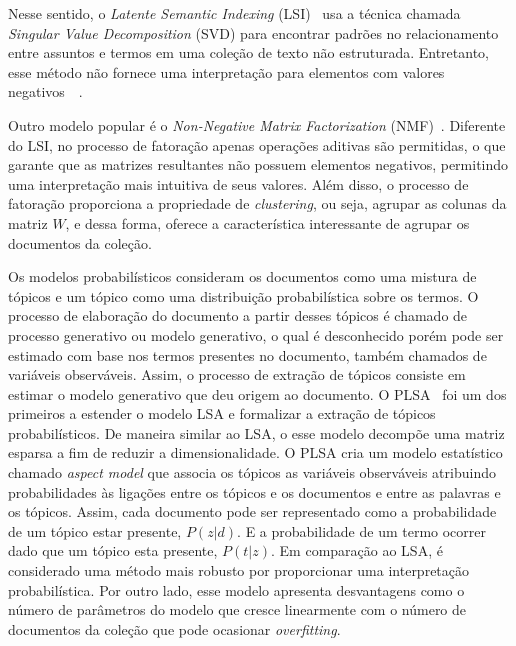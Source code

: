 Nesse sentido, o \textit{Latente Semantic Indexing} (LSI)~\cite{Deerwester1990} usa a técnica chamada \textit{Singular Value Decomposition} (SVD) para encontrar padrões no relacionamento entre assuntos e termos em uma coleção de texto não estruturada. Entretanto, esse método não fornece uma interpretação para elementos com valores negativos~\cite{Deerwester1990}~\cite{Cheng2013}. %

Outro modelo popular é o \textit{Non-Negative Matrix Factorization} (NMF)~\cite{Lee1999}.  Diferente do LSI, no processo de fatoração apenas operações aditivas são permitidas, o que garante que as matrizes resultantes não possuem elementos negativos, permitindo uma interpretação mais intuitiva de seus valores. Além disso, o processo de fatoração proporciona a propriedade de \textit{clustering}, ou seja, agrupar as colunas da matriz $W$, e dessa forma, oferece a característica interessante de agrupar os documentos da coleção.  %



Os modelos probabilísticos consideram os documentos como uma mistura de tópicos e um tópico como uma distribuição probabilística sobre os termos. O processo de elaboração do documento a partir desses tópicos é chamado de processo generativo ou modelo generativo, o qual é desconhecido porém pode ser estimado com base nos termos presentes no documento, também chamados de variáveis observáveis. Assim, o processo de extração de tópicos consiste em estimar o modelo generativo que deu origem ao documento.
% 
O PLSA~\cite{Hofmann1999} foi um dos primeiros a estender o modelo LSA e formalizar a extração de tópicos probabilísticos. De maneira similar ao LSA, o esse modelo decompõe uma matriz esparsa a fim de reduzir a dimensionalidade. O PLSA cria um modelo estatístico chamado \textit{aspect model} que associa os tópicos as variáveis observáveis atribuindo probabilidades às ligações entre os tópicos e os documentos e entre as palavras e os tópicos. Assim, cada documento pode ser representado como a probabilidade de um tópico estar presente, $P(z|d)$. E a probabilidade de um termo ocorrer dado que um tópico esta presente, $P(t|z)$. Em comparação ao LSA, é considerado uma método mais robusto por proporcionar uma interpretação probabilística. Por outro lado, esse modelo apresenta desvantagens como o número de parâmetros do modelo que cresce linearmente com o número de documentos da coleção que pode ocasionar \textit{overfitting}.   %

